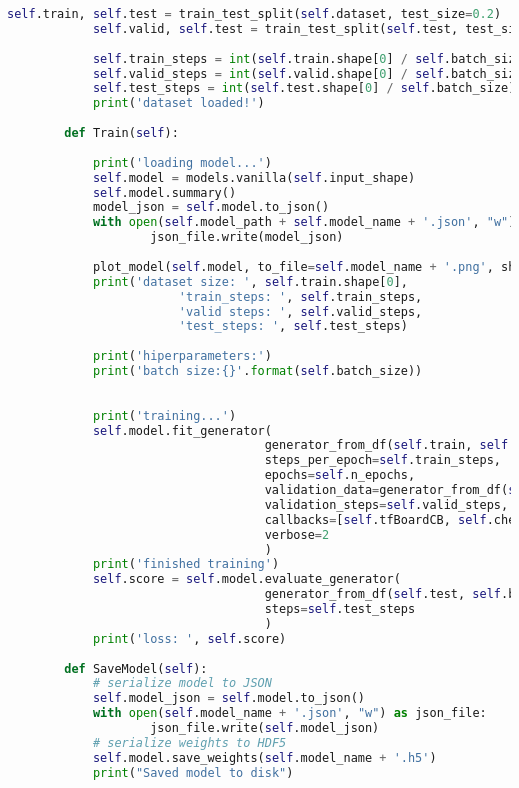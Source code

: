 \begin{lstlisting}[title={msg\_sync.py},language=Python]
            self.train, self.test = train_test_split(self.dataset, test_size=0.2)
            self.valid, self.test = train_test_split(self.test, test_size=0.7)
            
            self.train_steps = int(self.train.shape[0] / self.batch_size)
            self.valid_steps = int(self.valid.shape[0] / self.batch_size)
            self.test_steps = int(self.test.shape[0] / self.batch_size)
            print('dataset loaded!')
        
        def Train(self):
        
            print('loading model...')
            self.model = models.vanilla(self.input_shape)
            self.model.summary()
            model_json = self.model.to_json()
            with open(self.model_path + self.model_name + '.json', "w") as json_file:
                    json_file.write(model_json)
                    
            plot_model(self.model, to_file=self.model_name + '.png', show_shapes=True)
            print('dataset size: ', self.train.shape[0],
                        'train_steps: ', self.train_steps, 
                        'valid steps: ', self.valid_steps, 
                        'test_steps: ', self.test_steps)
                
            print('hiperparameters:')
            print('batch size:{}'.format(self.batch_size))
                
        
            print('training...')
            self.model.fit_generator(
                                    generator_from_df(self.train, self.batch_size, self.im_shape, 'angular'),
                                    steps_per_epoch=self.train_steps, 
                                    epochs=self.n_epochs,
                                    validation_data=generator_from_df(self.valid, self.batch_size, self.im_shape, 'angular'),
                                    validation_steps=self.valid_steps,
                                    callbacks=[self.tfBoardCB, self.checkpointCB],
                                    verbose=2
                                    )
            print('finished training')
            self.score = self.model.evaluate_generator(
                                    generator_from_df(self.test, self.batch_size, self.im_shape, 'angular'), 
                                    steps=self.test_steps
                                    )
            print('loss: ', self.score)
        
        def SaveModel(self):
            # serialize model to JSON
            self.model_json = self.model.to_json()
            with open(self.model_name + '.json', "w") as json_file:
                    json_file.write(self.model_json)
            # serialize weights to HDF5
            self.model.save_weights(self.model_name + '.h5')
            print("Saved model to disk")
        

\end{lstlisting}
